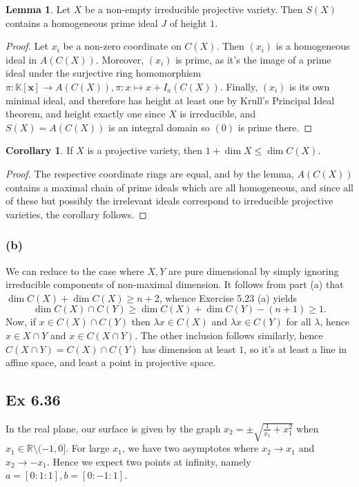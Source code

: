 \documentclass{article}
\theoremstyle{definition}
\newtheorem{corollary}[theorem]{Corollary}
\newtheorem{lemma}[theorem]{Lemma}
\newcommand{\R}{\mathbb{R}}
\newcommand{\K}{\mathbb{K}}
\newcommand{\Kx}{\K[\bm{x}]}
\begin{document}
\begin{lemma}
	Let $X$ be a non-empty irreducible projective variety. Then $S(X)$ contains
	a homogeneous prime ideal $J$ of height $1$.
\end{lemma}
\begin{proof}
	Let $x_i$ be a non-zero coordinate on $C(X)$. Then $(x_i)$ is a homogeneous
	ideal in $A(C(X))$. Moreover, $(x_i)$ is prime, as it's the image of a
	prime ideal under the surjective ring homomorphism $\pi: \Kx \to A(C(X)),
	\pi: x \mapsto x + I_a(C(X))$. Finally, $(x_i)$ is its own minimal ideal,
	and therefore has height at least one by Krull's Principal Ideal theorem,
	and height exactly one since $X$ is irreducible, and $S(X) = A(C(X))$ is an
	integral domain so $(0)$ is prime there.
\end{proof}

\begin{corollary}
	If $X$ is a projective variety, then $1 + \dim X \leq \dim C(X)$.
\end{corollary}
\begin{proof}
	The respective coordinate rings are equal, and by the lemma, $A(C(X))$
	contains a maximal chain of prime ideals which are all homogeneous, 
	and since all of these but possibly the irrelevant ideals correspond
	to irreducible projective varieties, the corollary follows.
\end{proof}

\subsubsection*{(b)}
We can reduce to the case where $X, Y$ are pure dimensional by simply ignoring
irreducible components of non-maximal dimension. It follows from part (a) that
$\dim C(X) + \dim C(X) \geq n + 2$, whence Exercise 5.23 (a) yields
\[
	\dim C(X) \cap C(Y) \geq \dim C(X) + \dim C(Y) - (n + 1) \geq 1.
\]
Now, if $x \in C(X) \cap C(Y)$ then $\lambda x \in C(X)$ and $\lambda x \in
C(Y)$ for all $\lambda$, hence $x \in X \cap Y$ and $x \in C(X \cap Y)$. The
other inclusion follows similarly, hence $C(X \cap Y) = C(X) \cap C(Y)$ has
dimension at least $1$, so it's at least a line in affine space, and least a
point in projective space.

\subsection*{Ex 6.36}

In the real plane, our surface is given by the graph $x_2 = \pm
\sqrt{\frac{1}{x_1} + x_1^{2}}$ when $x_1 \in \R \setminus (-1, 0]$. For large
$x_1$, we have two asymptotes where $x_2 \to x_1$ and $x_2 \to -x_1$. Hence we
expect two points at infinity, namely $a = [0 : 1 : 1], b = [0 : -1 : 1]$. \\
\end{document}
